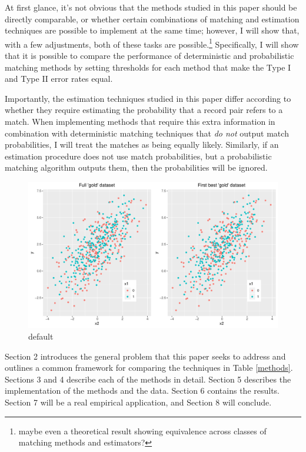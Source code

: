 \documentclass[12pt]{article}
\begin{document}
At first glance, it's not obvious that the methods studied in this paper should be directly comparable, or whether certain combinations of matching and estimation techniques are possible to implement at the same time; however, I will show that, with a few adjustments, both of these tasks are possible.\footnote{maybe even a theoretical result showing equivalence across classes of matching methods and estimators?}   Specifically, I will show that it is possible to compare the performance of deterministic and probabilistic matching methods by setting thresholds for each method that make the Type I and Type II error rates equal. 

Importantly, the estimation techniques studied in this paper differ according to whether they require estimating the probability that a record pair refers to a match.  When implementing methods that require this extra information in combination with deterministic matching techniques that \textit{do not} output match probabilities, I will treat the matches as being equally likely.  Similarly, if an estimation procedure does not use match probabilities, but a probabilistic matching algorithm outputs them, then the probabilities will be ignored.  






\begin{figure}[htbp]
\begin{center}
\includegraphics[width=\textwidth]{./Figures/gold_data_compare.pdf}
\caption{default}
\label{default}
\end{center}
\end{figure}

Section 2 introduces the general problem that this paper seeks to address and outlines a common framework for comparing the techniques in Table \ref{methods}.  Sections 3 and 4 describe each of the methods in detail. Section 5 describes the implementation of the methods and the data.  Section 6 contains the results.  Section 7 will be a real empirical application, and Section 8 will conclude.
\end{document}
